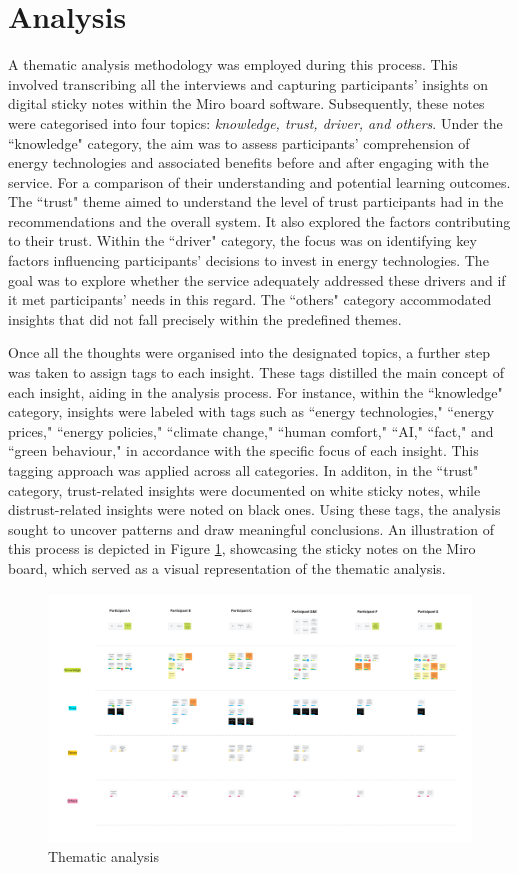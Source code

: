 \section{Analysis}

A thematic analysis methodology was employed during this process. 
This involved transcribing all the interviews and capturing participants' insights on digital sticky notes within the Miro board software. 
Subsequently, these notes were categorised into four topics: 
\emph{knowledge, trust, driver, and others}. 
Under the ``knowledge" category, the aim was to assess participants' comprehension of energy technologies and associated benefits before and after engaging with the service. 
For a comparison of their understanding and potential learning outcomes.
The ``trust" theme aimed to understand the level of trust participants had in the recommendations and the overall system. 
It also explored the factors contributing to their trust.
Within the ``driver" category, the focus was on identifying key factors influencing participants' decisions to invest in energy technologies. 
The goal was to explore whether the service adequately addressed these drivers and if it met participants' needs in this regard.
The ``others" category accommodated insights that did not fall precisely within the predefined themes. 

Once all the thoughts were organised into the designated topics, a further step was taken to assign tags to each insight. 
These tags distilled the main concept of each insight, aiding in the analysis process. 
For instance, within the ``knowledge" category, insights were labeled with tags such as ``energy technologies," ``energy prices," ``energy policies," ``climate change," ``human comfort," ``AI," ``fact," and ``green behaviour," 
in accordance with the specific focus of each insight.
This tagging approach was applied across all categories. 
In additon, in the ``trust" category, trust-related insights were documented on white sticky notes, while distrust-related insights were noted on black ones. 
Using these tags, the analysis sought to uncover patterns and draw meaningful conclusions. 
An illustration of this process is depicted in Figure \ref{fig:thematic}, showcasing the sticky notes on the Miro board, which served as a visual representation of the thematic analysis.
\begin{figure}[h!]
  \centering
  \includegraphics[width=\textwidth]{Images/thematic.pdf}
  \caption{Thematic analysis}
  \label{fig:thematic}
\end{figure}

